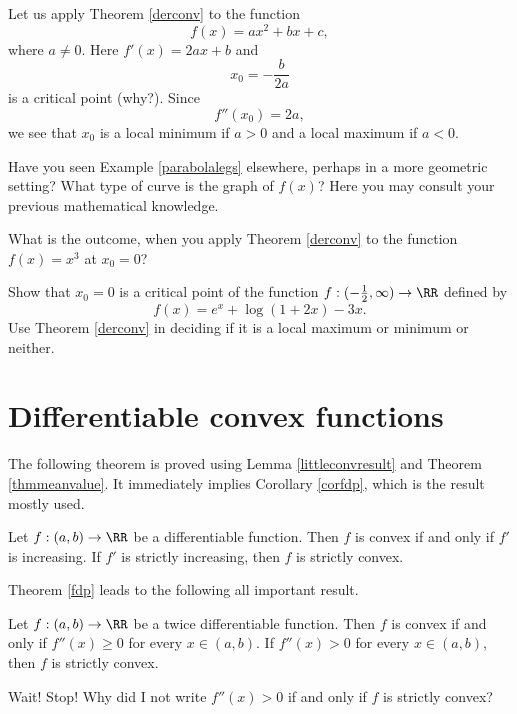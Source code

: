 \documentclass{article}
\begin{document}
\begin{example}\label{parabolalegs}
  Let us apply Theorem \ref{derconv} to the function
  $$
  f(x) = a x^2 + b x + c,
  $$
  where $a\neq 0$. Here $f'(x) = 2 a x + b$ and
  $$
  x_0 = - \frac{b}{2 a}
  $$
  is a critical point (why?). Since
  $$
  f''(x_0) = 2 a,
  $$
  we see that $x_0$ is a local minimum if $a > 0$ and a local maximum if
  $a < 0$.
\end{example}

\beginshex
Have you seen Example \ref{parabolalegs} elsewhere, perhaps in a more
geometric setting? What type of curve is the graph of $f(x)$? Here you may consult
your previous mathematical knowledge.

What is the outcome, when you apply Theorem \ref{derconv} to the
function $f(x) = x^3$ at $x_0 = 0$?
\endshex

\beginshex\label{exderconv}
Show that $x_0=0$ is a critical point of the function $f: (-\frac{1}{2}, \infty)\rightarrow \RR$
defined by
$$
f(x) = e^x + \log(1 + 2 x) - 3 x.
$$
Use Theorem \ref{derconv} in deciding if it is a local
maximum or minimum or neither.

\endshex

\section{Differentiable convex functions}


The following theorem is proved using Lemma \ref{littleconvresult} and
Theorem \ref{thmmeanvalue}. It immediately implies Corollary \ref{corfdp},
which is the result mostly used.


\begin{theorem}\label{fdp}
  Let $f:(a, b)\rightarrow \RR$ be a
  differentiable function. Then $f$ is convex if and only if $f'$ is
  increasing.  If $f'$ is strictly increasing, then $f$ is strictly
  convex.
\end{theorem}


Theorem \ref{fdp} leads to the following all important result.

\begin{corollary}[emph]\label{corfdp}
  Let $f:(a, b)\rightarrow \RR$ be a twice differentiable
  function. Then $f$ is convex if and only if $f''(x)\geq 0$ for every
  $x\in (a, b)$. If $f''(x) > 0$ for every $x\in (a, b)$, then $f$ is
  strictly convex.
\end{corollary}


\begin{frameit}
\begin{remark}
Wait! Stop! Why did I not write $f''(x) > 0$ if and only if 
$f$ is strictly convex?
\end{remark}
\end{frameit}
\end{document}
